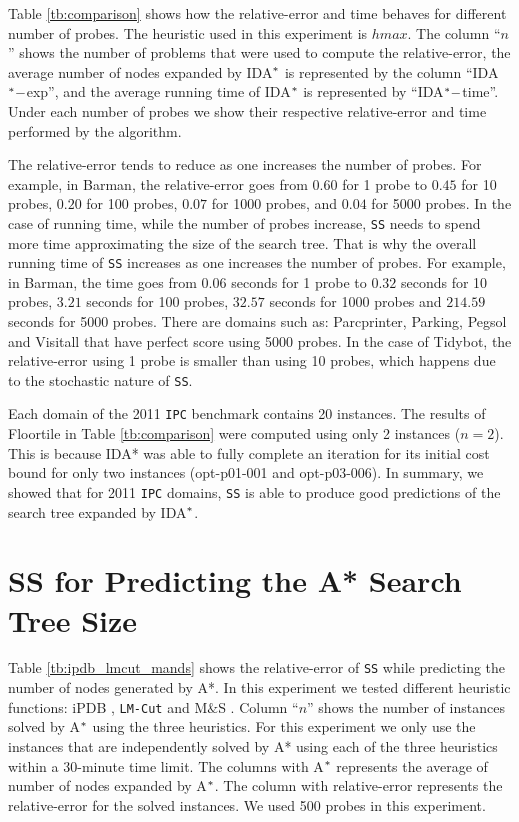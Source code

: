 Table \ref{tb:comparison} shows how the relative-error and time behaves for different number of probes. The heuristic used in this experiment is $hmax$. The column ``$n$'' shows the number of problems that were used to compute the relative-error, the average number of nodes expanded by IDA$\sp{*}$ is represented by the column ``IDA$\sp{*}-$exp'', and the average running time of IDA$\sp{*}$ is represented by ``IDA$\sp{*}-$time''. Under each number of probes we show their respective relative-error and time performed by the algorithm.

The relative-error tends to reduce as one increases the number of probes. For example, in Barman, the relative-error goes from $0.60$ for 1 probe to $0.45$ for 10 probes, $0.20$ for 100 probes, $0.07$ for 1000 probes, and $0.04$ for 5000 probes. In the case of running time, while the number of probes increase, \texttt{SS} needs to spend more time approximating the size of the search tree. That is why the overall running time of \texttt{SS} increases as one increases the number of probes. For example, in Barman, the time goes from $0.06$ seconds for 1 probe to $0.32$ seconds for 10 probes, $3.21$ seconds for 100 probes, $32.57$ seconds for 1000 probes and $214.59$ seconds for 5000 probes. There are domains such as: Parcprinter, Parking, Pegsol and Visitall that have perfect score using 5000 probes. In the case of Tidybot, the relative-error using 1 probe is smaller than using 10 probes, which happens due to the stochastic nature of \texttt{SS}.

Each domain of the 2011 \texttt{IPC} benchmark contains 20 instances. The results of Floortile in Table \ref{tb:comparison} were computed using only 2 instances ($n=2$). This is because IDA* was able to fully complete an iteration for its initial cost bound for only two instances (opt-p01-001 and opt-p03-006). In summary, we showed that for 2011 \texttt{IPC} domains, \texttt{SS} is able to produce good predictions of the search tree expanded by IDA$\sp{*}$. %

\section{SS for Predicting the A* Search Tree Size}

\noindent
Table \ref{tb:ipdb_lmcut_mands} shows the relative-error of \texttt{SS} while predicting the number of nodes generated by A*. In this experiment we tested different heuristic functions: iPDB \cite{haslum2007domain}, \texttt{LM-Cut} \cite{PommereningH13} and M$\&$S \cite{nissim2011computing}. Column ``$n$'' shows the number of instances solved by A$\sp{*}$ using the three heuristics. For this experiment we only use the instances that are independently solved by A* using each of the three heuristics within a 30-minute time limit. The columns with A$\sp{*}$ represents the average of number of nodes expanded by A$\sp{*}$. The column with relative-error represents the relative-error for the solved instances. We used 500 probes in this experiment. 


